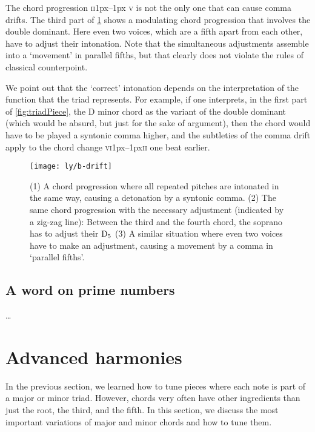 \documentclass[british,11pt]{scrartcl}
\begin{document}
The chord progression \textsc{ii}\kern1px–\kern1px \textsc{v} is not the only
one that can cause comma drifts. The third part of \cref{fig:drift} shows a
modulating chord progression that involves the double dominant. Here even two
voices, which are a fifth apart from each other, have to adjust their
intonation.  Note that the simultaneous adjustments assemble into a ‘movement’
in parallel fifths, but that clearly
does not violate the rules of classical counterpoint.

We point out that the ‘correct’ intonation depends on the interpretation of the
function that the triad represents.  For example, if one interprets, in the
first part of \cref{fig:triadPiece}, the D minor chord as the variant of the
double dominant (which would be absurd,
but just for the sake of argument), then the chord would have to be played a syntonic
comma higher, and the subtleties of the comma drift apply to the chord change
\textsc{vi}\kern1px–\kern1px\textsc{ii} one beat earlier.

\begin{figure}
  \centering
  \texttt{[image: ly/b-drift]}
  \caption{(1) A chord progression where all repeated pitches are intonated in
    the same way, causing a detonation by a syntonic comma.%
    \quad(2) The same chord progression with the necessary adjustment (indicated
    by a zig-zag line): Between the third and the fourth chord, the soprano has
    to adjust their $\text{D}_5$%
    \quad(3) A similar situation where even two voices have to make an
    adjustment, causing a movement by a comma in ‘parallel
    fifths’.}\label{fig:drift}
\end{figure}

\subsection{A word on prime numbers}

…

\section{Advanced harmonies}

In the previous section, we learned how to tune pieces where each note is part
of a major or minor triad.  However, chords very often have other ingredients
than just the root, the third, and the fifth.  In this section, we discuss the
most important variations of major and minor chords and how to tune them.
\end{document}
